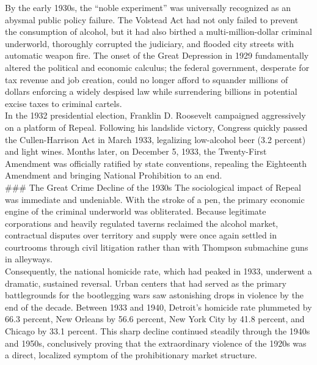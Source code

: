 \documentclass[
]{article}
\begin{document}
By the early 1930s, the ``noble experiment'' was universally recognized
as an abysmal public policy failure. The Volstead Act had not only
failed to prevent the consumption of alcohol, but it had also birthed a
multi-million-dollar criminal underworld, thoroughly corrupted the
judiciary, and flooded city streets with automatic weapon fire. The
onset of the Great Depression in 1929 fundamentally altered the
political and economic calculus; the federal government, desperate for
tax revenue and job creation, could no longer afford to squander
millions of dollars enforcing a widely despised law while surrendering
billions in potential excise taxes to criminal cartels.\\
In the 1932 presidential election, Franklin D. Roosevelt campaigned
aggressively on a platform of Repeal. Following his landslide victory,
Congress quickly passed the Cullen-Harrison Act in March 1933,
legalizing low-alcohol beer (3.2 percent) and light wines. Months later,
on December 5, 1933, the Twenty-First Amendment was officially ratified
by state conventions, repealing the Eighteenth Amendment and bringing
National Prohibition to an end.\\
\#\#\# The Great Crime Decline of the 1930s The sociological impact of
Repeal was immediate and undeniable. With the stroke of a pen, the
primary economic engine of the criminal underworld was obliterated.
Because legitimate corporations and heavily regulated taverns reclaimed
the alcohol market, contractual disputes over territory and supply were
once again settled in courtrooms through civil litigation rather than
with Thompson submachine guns in alleyways.\\
Consequently, the national homicide rate, which had peaked in 1933,
underwent a dramatic, sustained reversal. Urban centers that had served
as the primary battlegrounds for the bootlegging wars saw astonishing
drops in violence by the end of the decade. Between 1933 and 1940,
Detroit's homicide rate plummeted by 66.3 percent, New Orleans by 56.6
percent, New York City by 41.8 percent, and Chicago by 33.1 percent.
This sharp decline continued steadily through the 1940s and 1950s,
conclusively proving that the extraordinary violence of the 1920s was a
direct, localized symptom of the prohibitionary market structure.
\end{document}
